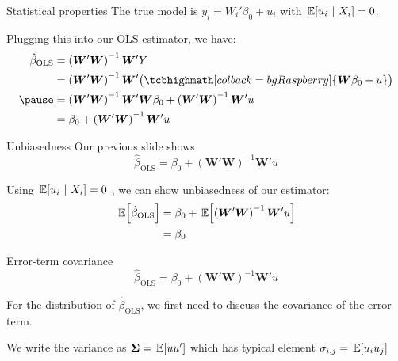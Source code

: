 \documentclass[aspectratio=169,t,11pt,table]{beamer}
\begin{document}
\begin{frame}{Statistical properties}
  The true model is $y_i = W_i' \beta_0 + u_i$ with $\expec{u_i}{X_i} = 0$.

  \bigskip
  Plugging this into our OLS estimator, we have:
  \begin{align*}
    \hat{\beta}_{\text{OLS}} 
    &= \left(\bm{W}' \bm{W} \right)^{-1} \bm{W}' Y \\
    &= \left(\bm{W}' \bm{W} \right)^{-1} \bm{W}' \big( \tcbhighmath[colback = bgRaspberry]{ \bm{W} \beta_0  + u } \big) \\ \pause
    &= \left(\bm{W}' \bm{W} \right)^{-1} \bm{W}' \bm{W} \beta_0 + 
       \left(\bm{W}' \bm{W} \right)^{-1} \bm{W}' u \\
    &= \beta_0 + \left(\bm{W}' \bm{W} \right)^{-1} \bm{W}' u \\ 
  \end{align*}
\end{frame}

\begin{frame}{Unbiasedness}
  Our previous slide shows 
  $$
    \hat{\beta}_{\text{OLS}} = \beta_0 + \left(\bm{W}' \bm{W} \right)^{-1} \bm{W}' u 
  $$

  \bigskip
  Using $\expec{u_i}{X_i} = 0$ , we can show unbiasedness of our estimator:
  \begin{align*}
    \expec{\hat{\beta}_{\text{OLS}}}
    &= \beta_0 + \expec{ \left(\bm{W}' \bm{W} \right)^{-1} \bm{W}' u } \\
    &= \beta_0
  \end{align*}
\end{frame}

\begin{frame}{Error-term covariance}
  \vspace*{-\bigskipamount}
  $$
    \hat{\beta}_{\text{OLS}} = \beta_0 + \left(\bm{W}' \bm{W} \right)^{-1} \bm{W}' u 
  $$
  
  \bigskip
  For the distribution of $\hat{\beta}_{\text{OLS}}$, we first need to discuss the covariance of the error term.

  \bigskip
  We write the variance as $\bm{\Sigma} = \expec{u u'}$ which has typical element $\sigma_{i,j} = \expec{u_i u_j}$
\end{frame}
\end{document}
